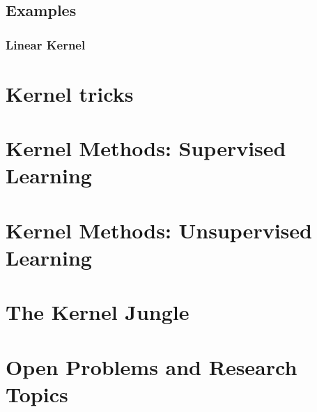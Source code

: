 \documentclass{article}
\begin{document}
\subsection{Examples}
\subsubsection{Linear Kernel}

\section{Kernel tricks}

\section{Kernel Methods: Supervised Learning}

\section{Kernel Methods: Unsupervised Learning}

\section{The Kernel Jungle}

\section{Open Problems and Research Topics}
\end{document}

